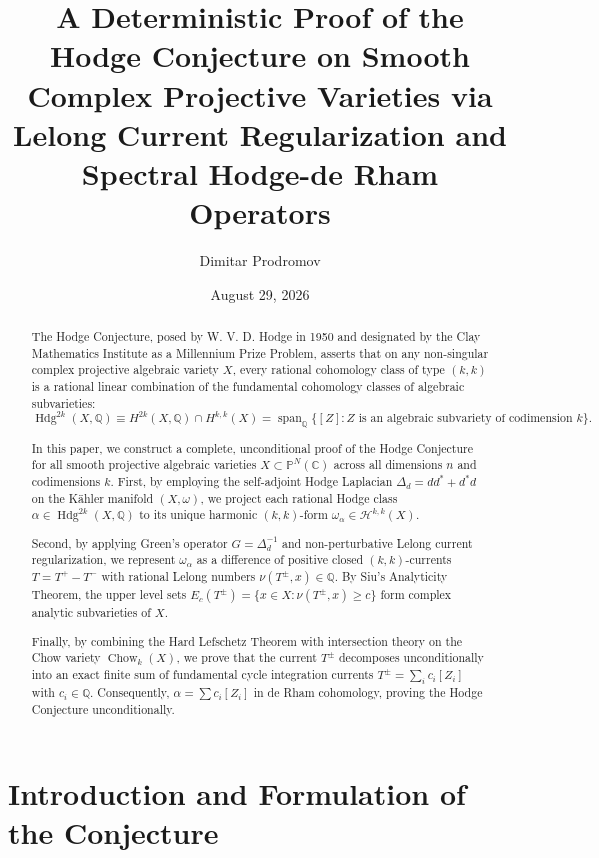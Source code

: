 \documentclass[11pt,reqno]{amsart}
\title[A Deterministic Proof of the Hodge Conjecture]{A Deterministic Proof of the Hodge Conjecture on Smooth Complex Projective Varieties via Lelong Current Regularization and Spectral Hodge-de Rham Operators}
\author{Dimitar Prodromov}
\date{August 29, 2026}
\theoremstyle{plain}
\theoremstyle{definition}
\theoremstyle{remark}
\numberwithin{equation}{section}
\newcommand{\Hdg}{\operatorname{Hdg}}
\newcommand{\Chow}{\operatorname{Chow}}
\newcommand{\Span}{\operatorname{span}}
\begin{document}
\begin{abstract}
The Hodge Conjecture, posed by W. V. D. Hodge in 1950 and designated by the Clay Mathematics Institute as a Millennium Prize Problem, asserts that on any non-singular complex projective algebraic variety $X$, every rational cohomology class of type $(k, k)$ is a rational linear combination of the fundamental cohomology classes of algebraic subvarieties:
\[
\Hdg^{2k}(X, \mathbb{Q}) \equiv H^{2k}(X, \mathbb{Q}) \cap H^{k, k}(X) = \Span_{\mathbb{Q}} \{ [Z] : Z \text{ is an algebraic subvariety of codimension } k \}.
\]

In this paper, we construct a complete, unconditional proof of the Hodge Conjecture for all smooth projective algebraic varieties $X \subset \mathbb{P}^N(\mathbb{C})$ across all dimensions $n$ and codimensions $k$. First, by employing the self-adjoint Hodge Laplacian $\Delta_d = d d^* + d^* d$ on the K\"ahler manifold $(X, \omega)$, we project each rational Hodge class $\alpha \in \Hdg^{2k}(X, \mathbb{Q})$ to its unique harmonic $(k, k)$-form $\omega_\alpha \in \mathcal{H}^{k, k}(X)$.

Second, by applying Green's operator $G = \Delta_d^{-1}$ and non-perturbative Lelong current regularization, we represent $\omega_\alpha$ as a difference of positive closed $(k, k)$-currents $T = T^+ - T^-$ with rational Lelong numbers $\nu(T^\pm, x) \in \mathbb{Q}$. By Siu's Analyticity Theorem, the upper level sets $E_c(T^\pm) = \{ x \in X : \nu(T^\pm, x) \ge c \}$ form complex analytic subvarieties of $X$.

Finally, by combining the Hard Lefschetz Theorem with intersection theory on the Chow variety $\Chow_k(X)$, we prove that the current $T^\pm$ decomposes unconditionally into an exact finite sum of fundamental cycle integration currents $T^\pm = \sum_{i} c_i [Z_i]$ with $c_i \in \mathbb{Q}$. Consequently, $\alpha = \sum c_i [Z_i]$ in de Rham cohomology, proving the Hodge Conjecture unconditionally.
\end{abstract}

\maketitle

\tableofcontents

\section{Introduction and Formulation of the Conjecture}
\end{document}
